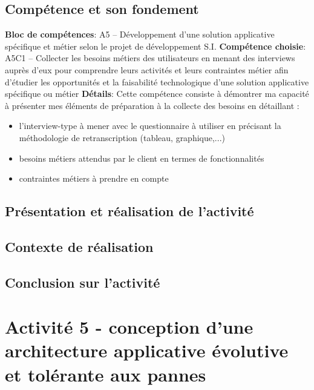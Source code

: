 \documentclass[a4paper, 11pt]{report}
\begin{document}
\subsection{Compétence et son fondement}
\textbf{Bloc de compétences}: A5 – Développement d’une solution applicative spécifique et métier selon le projet de développement S.I.
\newline
\textbf{Compétence choisie}: A5C1 – Collecter les besoins métiers des utilisateurs en menant des interviews auprès d’eux pour comprendre leurs activités et leurs contraintes métier afin d’étudier les opportunités et la faisabilité technologique d’une solution applicative spécifique ou métier
\newline
\textbf{Détails}: Cette compétence consiste à démontrer ma capacité à présenter mes éléments de préparation à la collecte des besoins en détaillant :
\begin{itemize}
  \item l’interview-type à mener avec le questionnaire à utiliser en précisant la méthodologie de retranscription (tableau, graphique,...)
  \item besoins métiers attendus par le client en termes de fonctionnalités
  \item contraintes métiers à prendre en compte
\end{itemize}
\subsection{Présentation et réalisation de l'activité}
\subsection{Contexte de réalisation}
\subsection{Conclusion sur l'activité}

\section{Activité 5 - conception d'une architecture applicative évolutive et tolérante aux pannes}
\end{document}
